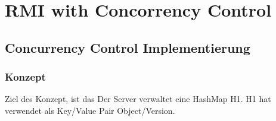 \chapter{RMI with Concorrency Control}

\section{Concurrency Control Implementierung }
\label{sec:conc-contr-impl}



\subsection{Konzept}
\label{sec:konzept}

Ziel des Konzept, ist das  
Der Server verwaltet eine HashMap H1. H1 hat verwendet als Key/Value Pair Object/Version. 




